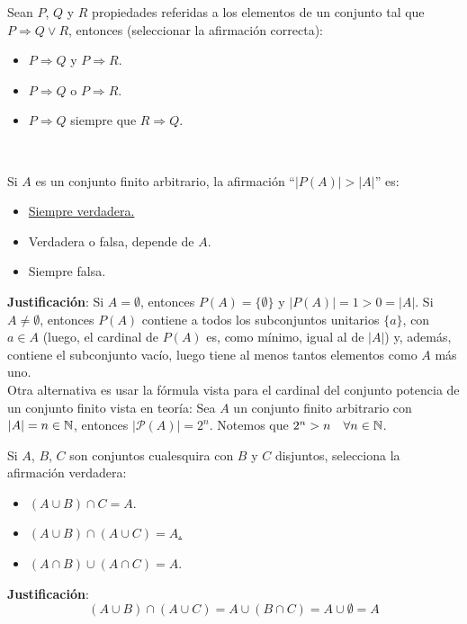 \begin{ejercicio}
    Sean $P$, $Q$ y $R$ propiedades referidas a los elementos de un conjunto tal que $P \Rightarrow Q \lor R$, entonces (seleccionar la afirmación correcta):
    \begin{itemize}
        \item $P \Rightarrow Q$ y $P \Rightarrow R$.
        \item $P \Rightarrow Q$ o $P \Rightarrow R$.
        \item $P \Rightarrow Q$ siempre que $R \Rightarrow Q$.
    \end{itemize}
\end{ejercicio}

\newpage
\ %
\resetearcontador

\begin{ejercicio}
    Si $A$ es un conjunto finito arbitrario, la afirmación ``$|P(A)| > |A|$'' es:
    \begin{itemize}
        \item \underline{Siempre verdadera.}
        \item Verdadera o falsa, depende de $A$.
        \item Siempre falsa.
    \end{itemize}

    \noindent
    \textbf{Justificación}:
    Si $A = \emptyset$, entonces $P(A) = \{\emptyset\}$ y $|P(A)|=1>0=|A|$.\newline
    Si $A \neq \emptyset$, entonces $P(A)$ contiene a todos los subconjuntos unitarios $\{a\}$, con $a \in A$ (luego, el cardinal de $P(A)$ es, como mínimo, igual al de $|A|$) y, además, contiene el subconjunto vacío, luego tiene al menos tantos elementos como $A$ más uno.\\

    \noindent
    Otra alternativa es usar la fórmula vista para el cardinal del conjunto potencia de un conjunto finito vista en teoría:\newline
    Sea $A$ un conjunto finito arbitrario con $|A| = n \in \mathbb{N}$, entonces $|\mathcal{P}(A)| = 2^n$.\newline
    Notemos que $2^n > n\quad\forall n \in \mathbb{N}$.
\end{ejercicio}

\begin{ejercicio}
    Si $A$, $B$, $C$ son conjuntos cualesquira con $B$ y $C$ disjuntos, selecciona la afirmación verdadera:
    \begin{itemize}
        \item $(A \cup B)\cap C = A$.
        \item \underline{$(A \cup B)\cap (A \cup C)=A$.}
        \item $(A\cap B)\cup(A \cap C)=A$.
    \end{itemize}

    \noindent
    \textbf{Justificación}:
    \begin{equation*}
        (A \cup B) \cap (A \cup C) = A \cup (B \cap C) = A \cup \emptyset = A    
    \end{equation*}
\end{ejercicio}

